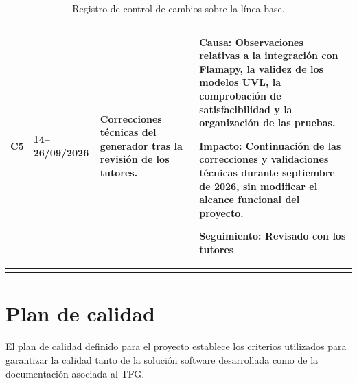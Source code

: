 \begin{longtable}{@{}P{0.8cm} P{2.5cm} P{4.0cm} P{\dimexpr\textwidth-7.3cm-6\tabcolsep\relax}@{}}
C5 &
14--26/09/2026 &
Correcciones técnicas del generador tras la revisión de los tutores. &
\textbf{Causa:} Observaciones relativas a la integración con Flamapy,
la validez de los modelos UVL, la comprobación de satisfacibilidad y
la organización de las pruebas.\par
\textbf{Impacto:} Continuación de las correcciones y validaciones
técnicas durante septiembre de 2026, sin modificar el alcance funcional
del proyecto.\par
\textbf{Seguimiento:} Revisado con los tutores \\

\bottomrule
\caption{Registro de control de cambios sobre la línea base.}
  \label{tab:control_cambios}
\end{longtable}

\section{Plan de calidad}
\label{sec:plan_calidad}



El plan de calidad definido para el proyecto establece los criterios utilizados para garantizar la calidad tanto de la solución software desarrollada como de la documentación asociada al TFG.

